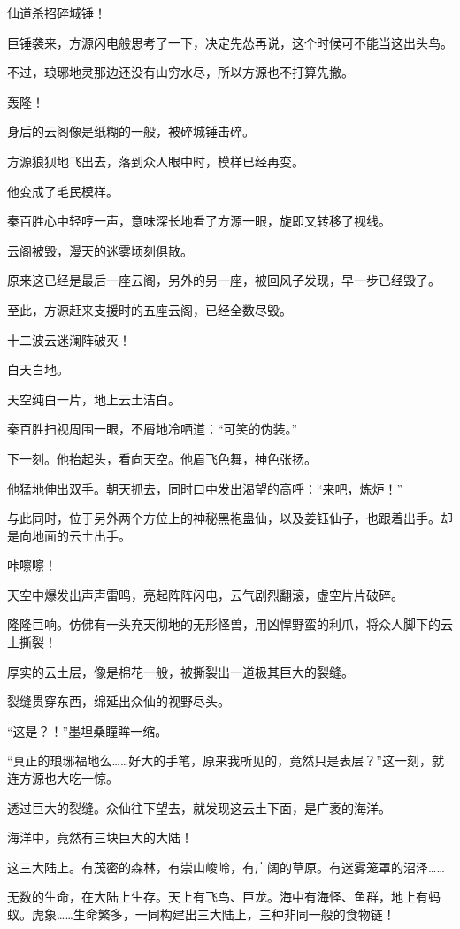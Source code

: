 \begin{this_body}
仙道杀招碎城锤！

巨锤袭来，方源闪电般思考了一下，决定先怂再说，这个时候可不能当这出头鸟。

不过，琅琊地灵那边还没有山穷水尽，所以方源也不打算先撤。

轰隆！

身后的云阁像是纸糊的一般，被碎城锤击碎。

方源狼狈地飞出去，落到众人眼中时，模样已经再变。

他变成了毛民模样。

秦百胜心中轻哼一声，意味深长地看了方源一眼，旋即又转移了视线。

云阁被毁，漫天的迷雾顷刻俱散。

原来这已经是最后一座云阁，另外的另一座，被回风子发现，早一步已经毁了。

至此，方源赶来支援时的五座云阁，已经全数尽毁。

十二波云迷澜阵破灭！

白天白地。

天空纯白一片，地上云土洁白。

秦百胜扫视周围一眼，不屑地冷哂道：“可笑的伪装。”

下一刻。他抬起头，看向天空。他眉飞色舞，神色张扬。

他猛地伸出双手。朝天抓去，同时口中发出渴望的高呼：“来吧，炼炉！”

与此同时，位于另外两个方位上的神秘黑袍蛊仙，以及姜钰仙子，也跟着出手。却是向地面的云土出手。

咔嚓嚓！

天空中爆发出声声雷鸣，亮起阵阵闪电，云气剧烈翻滚，虚空片片破碎。

隆隆巨响。仿佛有一头充天彻地的无形怪兽，用凶悍野蛮的利爪，将众人脚下的云土撕裂！

厚实的云土层，像是棉花一般，被撕裂出一道极其巨大的裂缝。

裂缝贯穿东西，绵延出众仙的视野尽头。

“这是？！”墨坦桑瞳眸一缩。

“真正的琅琊福地么……好大的手笔，原来我所见的，竟然只是表层？”这一刻，就连方源也大吃一惊。

透过巨大的裂缝。众仙往下望去，就发现这云土下面，是广袤的海洋。

海洋中，竟然有三块巨大的大陆！

这三大陆上。有茂密的森林，有崇山峻岭，有广阔的草原。有迷雾笼罩的沼泽……

无数的生命，在大陆上生存。天上有飞鸟、巨龙。海中有海怪、鱼群，地上有蚂蚁。虎象……生命繁多，一同构建出三大陆上，三种非同一般的食物链！


\end{this_body}
